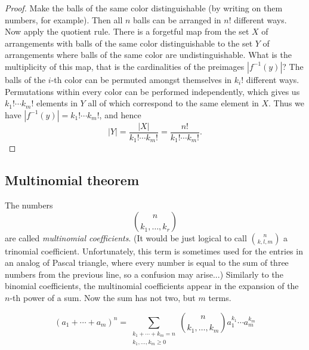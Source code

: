 \begin{page}

\begin{proof}
Make the balls of the same color distinguishable (by writing on them numbers, for example).
Then all $n$ balls can be arranged in $n!$ different ways.
Now apply the quotient rule.
There is a forgetful map from the set $X$ of arrangements with balls of the same color distinguishable
to the set $Y$ of arrangements where balls of the same color are undistinguishable.
What is the multiplicity of this map, that is the cardinalities of the preimages $|f^{-1}(y)|$?
The balls of the $i$-th color can be permuted amongst themselves in $k_i!$ different ways.
Permutations within every color can be performed independently, which gives us $k_1! \cdots k_m!$ elements in $Y$
all of which correspond to the same element in $X$.
Thus we have $|f^{-1}(y)| = k_1! \cdots k_m!$, and hence
\[
|Y| = \frac{|X|}{k_1! \cdots k_m!} = \frac{n!}{k_1! \cdots k_m!}.
\]
\end{proof}




\end{page}

\begin{page}

\subsection{Multinomial theorem}
The numbers
\[
\binom{n}{k_1, \ldots, k_r}
\]
are called \emph{multinomial coefficients}.
(It would be just logical to call $\binom{n}{k, l, m}$ a trinomial coefficient.
Unfortunately, this term is sometimes used for the entries in an analog of Pascal triangle,
where every number is equal to the sum of three numbers from the previous line, so a confusion may arise...)
Similarly to the binomial coefficients, the multinomial coefficients appear in the expansion of the $n$-th power of a sum.
Now the sum has not two, but $m$ terms.


\end{page}

\begin{page}

\begin{thm}
\[
(a_1 + \cdots + a_m)^n = \sum_{\substack{k_1 + \cdots + k_m = n\\ k_1, \ldots, k_m \ge 0}}
\binom{n}{k_1, \ldots, k_m} a_1^{k_1} \cdots a_m^{k_m}
\]
\end{thm}

\end{page}

